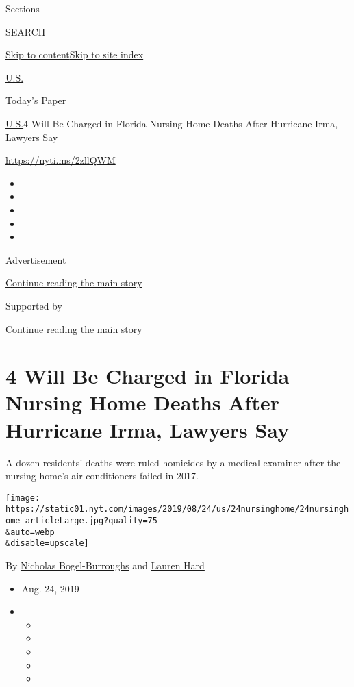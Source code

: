 Sections

SEARCH

\protect\hyperlink{site-content}{Skip to
content}\protect\hyperlink{site-index}{Skip to site index}

\href{https://www.nytimes.com/section/us}{U.S.}

\href{https://myaccount.nytimes.com/auth/login?response_type=cookie\&client_id=vi}{}

\href{https://www.nytimes.com/section/todayspaper}{Today's Paper}

\href{/section/us}{U.S.}\textbar{}4 Will Be Charged in Florida Nursing
Home Deaths After Hurricane Irma, Lawyers Say

\url{https://nyti.ms/2zllQWM}

\begin{itemize}
\item
\item
\item
\item
\item
\end{itemize}

Advertisement

\protect\hyperlink{after-top}{Continue reading the main story}

Supported by

\protect\hyperlink{after-sponsor}{Continue reading the main story}

\hypertarget{4-will-be-charged-in-florida-nursing-home-deaths-after-hurricane-irma-lawyers-say}{%
\section{4 Will Be Charged in Florida Nursing Home Deaths After
Hurricane Irma, Lawyers
Say}\label{4-will-be-charged-in-florida-nursing-home-deaths-after-hurricane-irma-lawyers-say}}

A dozen residents' deaths were ruled homicides by a medical examiner
after the nursing home's air-conditioners failed in 2017.

\texttt{[image: https://static01.nyt.com/images/2019/08/24/us/24nursinghome/24nursinghome-articleLarge.jpg?quality=75\\\&auto=webp\\\&disable=upscale]}

By \href{https://www.nytimes.com/by/nicholas-bogel-burroughs}{Nicholas
Bogel-Burroughs} and
\href{https://www.nytimes.com/by/lauren-hard}{Lauren Hard}

\begin{itemize}
\item
  Aug. 24, 2019
\item
  \begin{itemize}
  \item
  \item
  \item
  \item
  \item
  \end{itemize}
\end{itemize}

